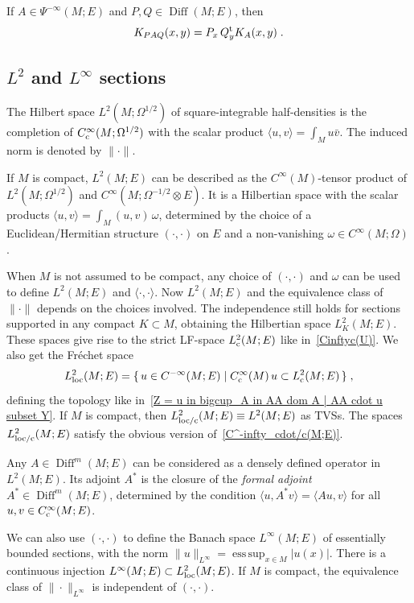 \documentclass{memo-l}
\theoremstyle{plain}
\theoremstyle{definition}
\theoremstyle{remark}
\newcommand{\esssup}{\operatorname{ess\,sup}}
\newcommand{\Diff}{\operatorname{Diff}}
\newcommand{\co}{{\text{\rm c}}}
\newcommand{\trans}{{\text{\rm t}}}
\newcommand{\Cinftyc}{C^\infty_{\text{\rm c}}}
\numberwithin{section}{chapter}
\numberwithin{equation}{section}%
\begin{document}
If $A\in\Psi^{-\infty}(M;E)$ and $P,Q\in\Diff(M;E)$, then
\begin{equation}\label{K_PAQ(x y)}
K_{PAQ}(x,y)=P_x\,Q_y^\trans K_A(x,y)\;.
\end{equation}


\subsection{$L^2$ and $L^\infty$ sections}\label{ss: L^2 and L^infty}

The Hilbert space $L^2(M;\Omega^{1/2})$ of square-integrable half-densities is the completion of $\Cinftyc(M;\Omega^{1/2})$ with the scalar product $\langle u,v\rangle=\int_Mu\bar v$. The induced norm is denoted by $\|{\cdot}\|$.

If $M$ is compact, $L^2(M;E)$  can be described as the $C^\infty(M)$-tensor product of $L^2(M;\Omega^{1/2})$ and $C^\infty(M;\Omega^{-1/2}\otimes E)$. It is a Hilbertian space with the scalar products $\langle u,v\rangle=\int_M(u,v)\,\omega$, determined by the choice of a Euclidean/Hermitian structure $({\cdot},{\cdot})$ on $E$ and a non-vanishing $\omega\in C^\infty(M;\Omega)$.

When $M$ is not assumed to be compact, any choice of $({\cdot},{\cdot})$ and $\omega$ can be used to define $L^2(M;E)$ and $\langle{\cdot},{\cdot}\rangle$. Now $L^2(M;E)$ and the equivalence class of $\|{\cdot}\|$ depends on the choices involved. The independence still holds for sections supported in any compact $K\subset M$, obtaining the Hilbertian space $L^2_K(M;E)$. These spaces give rise to the strict LF-space $L^2_\co(M;E)$ like in~\eqref{Cinftyc(U)}. We also get the Fr\'echet space
\[
L^2_{\text{\rm loc}}(M;E)=\{\,u\in C^{-\infty}(M;E)\mid\Cinftyc(M)\,u\subset L^2_\co(M;E)\,\}\;,
\]
defining the topology like in~\eqref{Z = u in bigcup_A in AA dom A | AA cdot u subset Y}. If $M$ is compact, then $L^2_{\text{\rm loc/c}}(M;E)\equiv L^2(M;E)$ as TVSs. The spaces $L^2_{\text{\rm loc/c}}(M;E)$ satisfy the obvious version of~\eqref{C^-infty_cdot/c(M;E)}.

Any $A\in\Diff^m(M;E)$ can be considered as a densely defined operator in $L^2(M;E)$. Its adjoint $A^*$ is the closure of the \emph{formal adjoint} $A^*\in\Diff^m(M;E)$, determined by the condition $\langle u,A^*v\rangle=\langle Au,v\rangle$ for all $u,v\in \Cinftyc(M;E)$.

We can also use $({\cdot},{\cdot})$ to define the Banach space $L^\infty(M;E)$ of essentially bounded sections, with the norm $\|u\|_{L^\infty}=\esssup_{x\in M}|u(x)|$. There is a continuous injection $L^\infty(M;E)\subset L^2_{\text{\rm loc}}(M;E)$.  If $M$ is compact, the equivalence class of $\|{\cdot}\|_{L^\infty}$ is independent of $({\cdot},{\cdot})$. 
\end{document}
